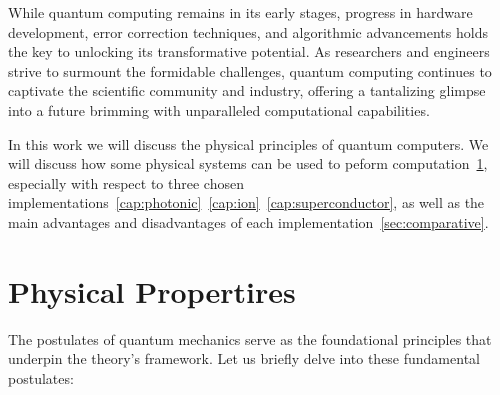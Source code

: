 \documentclass[
  journal=largetwo,
  year=2023,
]{cup-journal}
\begin{document}
While quantum computing remains in its early stages, progress in hardware development, error correction techniques, and algorithmic advancements holds the key to unlocking its transformative potential. As researchers and engineers strive to surmount the formidable challenges, quantum computing continues to captivate the scientific community and industry, offering a tantalizing glimpse into a future brimming with unparalleled computational capabilities.

In this work we will discuss the physical principles of quantum computers. We will discuss how some physical systems can be used to peform computation~\ref{sec:physical_properties}, especially with respect to three chosen implementations~\ref{cap:photonic}~\ref{cap:ion}~\ref{cap:superconductor}, as well as the main advantages and disadvantages of each implementation~\ref{sec:comparative}.


\section{Physical Propertires}
\label{sec:physical_properties}

The postulates of quantum mechanics serve as the foundational principles that underpin the theory's framework. Let us briefly delve into these fundamental postulates\autocite{cohentannoudji_1977_quantum}:
\end{document}
